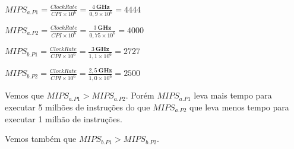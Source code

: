 \documentclass{article}
\begin{document}
$MIPS_{a.P1} = \frac{Clock Rate}{CPI \times 10^{6}} = \frac{4\ \textbf{GHz}}{0,9
\times 10^{6}} = 4444$

$MIPS_{a.P2} = \frac{Clock Rate}{CPI \times 10^{6}} = \frac{3\
\textbf{GHz}}{0,75 \times 10^{6}} = 4000$

$MIPS_{b.P1} = \frac{Clock Rate}{CPI \times 10^{6}} = \frac{3\ \textbf{GHz}}{1,1
\times 10^{6}} = 2727$

$MIPS_{b.P2} = \frac{Clock Rate}{CPI \times 10^{6}} = \frac{2,5\ 
\textbf{GHz}}{1,0 \times 10^{6}} = 2500$

Vemos que $MIPS_{a.P1} > MIPS_{a.P2}$. Porém $MIPS_{a.P1}$ leva mais tempo para 
executar 5 milhões de instruções do que $MIPS_{a.P2}$ que leva menos tempo para 
executar 1 milhão de instruções.

Vemos também que $MIPS_{b.P1} > MIPS_{b.P2}$.
\end{document}
